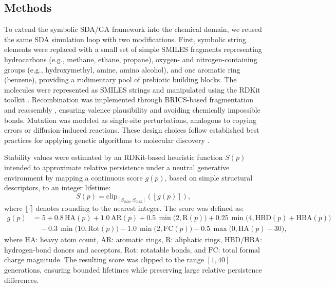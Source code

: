 \documentclass{artificial-life}
\let\cite\citep
\begin{document}
\subsection{Methods}
To extend the symbolic SDA/GA framework into the chemical domain, we reused the same SDA simulation loop with two modifications. First, symbolic string elements were replaced with a small set of simple SMILES fragments representing hydrocarbons (e.g., methane, ethane, propane), oxygen- and nitrogen-containing groups (e.g., hydroxymethyl, amine, amino alcohol), and one aromatic ring (benzene), providing a rudimentary pool of prebiotic building blocks. The molecules were represented as SMILES strings and manipulated using the RDKit toolkit \cite{landrum2006rdkit}. Recombination was implemented through BRICS-based fragmentation and reassembly \cite{degen2008art}, ensuring valence plausibility and avoiding chemically impossible bonds. Mutation was modeled as single-site perturbations, analogous to copying errors or diffusion-induced reactions. These design choices follow established best practices for applying genetic algorithms to molecular discovery \cite{janet2023bestpractices}.

Stability values were estimated by an RDKit-based heuristic function $S(p)$ intended to approximate relative persistence under a neutral generative environment by mapping a continuous score $g(p)$, based on simple structural descriptors, to an integer lifetime:
\begin{equation}
S(p)=\mathrm{clip}_{[S_{\min},S_{\max}]}\!\left(\left\lfloor g(p)\right\rceil\right),
\end{equation}
where $\lfloor\cdot\rceil$ denotes rounding to the nearest integer. The score was defined as:
\begin{equation}
\begin{aligned}
g(p) &= 5 + 0.8\,\mathrm{HA}(p)
      + 1.0\,\mathrm{AR}(p)
      + 0.5\,\min\!\big(2,\mathrm{R}(p)\big)
      + 0.25\,\min\!\big(4,\mathrm{HBD}(p)+\mathrm{HBA}(p)\big) \\
&\quad - 0.3\,\min\!\big(10,\mathrm{Rot}(p)\big)
      - 1.0\,\min\!\big(2,\mathrm{FC}(p)\big)
      - 0.5\,\max\!\big(0,\mathrm{HA}(p)-30\big),
\end{aligned}
\end{equation}
where $\mathrm{HA}$: heavy atom count, $\mathrm{AR}$: aromatic rings, $\mathrm{R}$: aliphatic rings, $\mathrm{HBD/HBA}$: hydrogen-bond donors and acceptors, $\mathrm{Rot}$: rotatable bonds, and $\mathrm{FC}$: total formal charge magnitude. The resulting score was clipped to the range $[1,40]$ generations, ensuring bounded lifetimes while preserving large relative persistence differences.
\end{document}
